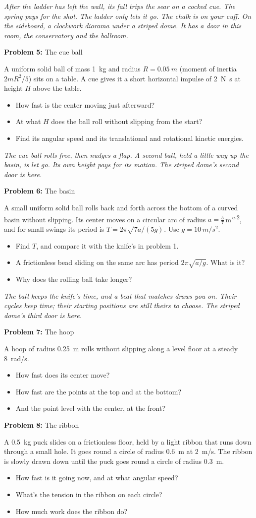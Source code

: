 \documentclass[11pt]{article}
\newcommand{\room}[1]{\par\bigskip{\large\bfseries #1}\par\nopagebreak\smallskip}
\newcommand{\scene}[1]{\par{\itshape #1}\par}
\newcommand{\problem}[2]{\par\medskip\textbf{Problem #1:} #2\par\nopagebreak}
\newenvironment{parts}{\begin{itemize}[leftmargin=3.4em,labelwidth=2.8em,labelsep=0.6em,align=left,itemsep=2pt,topsep=3pt]}{\end{itemize}}
\newcommand{\pt}[1]{\item[\textbf{#1}]}
\newcommand{\sv}[1]{\textsuperscript{\dag\,#1}}
\begin{document}
\room{Billiard room}
\scene{After the ladder has left the wall, its fall trips the sear on a cocked cue. The spring pays for the shot. The ladder only lets it go. The chalk is on your cuff. On the sideboard, a clockwork diorama under a striped dome. It has a door in this room, the conservatory and the ballroom.}
\problem{5}{The cue ball}
A uniform solid ball of mass \SI{1}{kg} and radius $R = \SI{0.05}{m}$ (moment of inertia $2mR^2/5$) sits on a table. A cue gives it a short horizontal impulse of \SI{2}{N.s} at height $H$ above the table.
\begin{parts}
\pt{5-a} How fast is the center moving just afterward?
\pt{5-b} At what $H$ does the ball roll without slipping from the start?
\pt{5-c} Find its angular speed and its translational and rotational kinetic energies.
\end{parts}

\room{Conservatory}
\scene{The cue ball rolls free, then nudges a flap. A second ball, held a little way up the basin, is let go. Its own height pays for its motion. The striped dome's second door is here.}
\problem{6}{The basin}
A small uniform solid ball rolls back and forth across the bottom of a curved basin without slipping. Its center moves on a circular arc of radius $a = \frac{5}{7}$\,m\sv{c-2}, and for small swings its period is $T = 2\pi\sqrt{7a/(5g)}$. Use $g = \SI{10}{m/s^2}$.
\begin{parts}
\pt{6-a} Find $T$, and compare it with the knife's in problem 1.
\pt{6-b} A frictionless bead sliding on the same arc has period $2\pi\sqrt{a/g}$. What is it?
\pt{6-c} Why does the rolling ball take longer?
\end{parts}

\room{Ballroom}
\scene{The ball keeps the knife's time, and a beat that matches draws you on. Their cycles keep time; their starting positions are still theirs to choose. The striped dome's third door is here.}
\problem{7}{The hoop}
A hoop of radius \SI{0.25}{m} rolls without slipping along a level floor at a steady \SI{8}{rad/s}.
\begin{parts}
\pt{7-a} How fast does its center move?
\pt{7-b} How fast are the points at the top and at the bottom?
\pt{7-c} And the point level with the center, at the front?
\end{parts}

\problem{8}{The ribbon}
A \SI{0.5}{kg} puck slides on a frictionless floor, held by a light ribbon that runs down through a small hole. It goes round a circle of radius \SI{0.6}{m} at \SI{2}{m/s}. The ribbon is slowly drawn down until the puck goes round a circle of radius \SI{0.3}{m}.
\begin{parts}
\pt{8-a} How fast is it going now, and at what angular speed?
\pt{8-b} What's the tension in the ribbon on each circle?
\pt{8-c} How much work does the ribbon do?
\end{parts}
\end{document}
